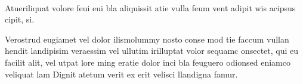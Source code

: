 \documentclass[a4paper,bcor=0mm,9pt,parskip=full,twoside]{tubsartcl}
\begin{document}

\begin{gaussbox}[logosep]{1}{1}{2}{8}
\large
\lipsum[4]
\end{gaussbox}
\begin{gaussbox}[c]{3}{1}{2}{8}
\large
\lipsum[2]
\end{gaussbox}
\begin{gaussbox}[b]{5}{1}{2}{8}
\large
\lipsum[2]
\end{gaussbox}
~\clearpage

\begin{gaussbox}{1}{1}{5}{1}
{\LARGE\sffamily\bfseries\raggedright Atueriliquat volore feui eui bla
aliquissit atie vulla feum vent
adipit wis acipsus cipit, si.\par}
\end{gaussbox}
\begin{gaussbox}[frame=fbox]{2}{2}{5}{1}
\mdseries
Verostrud eugiamet vel dolor ilismolummy nosto conse mod tie
faccum vullan hendit landipisim veraessim vel ullutim irilluptat volor
sequamc onsectet, qui eu facilit alit, vel utpat lore ming eratie dolor
inci bla feuguero odionsed eniamco veliquat lam Dignit atetum verit
ex erit velisci llandigna famur.
\end{gaussbox}
\begin{gaussbox}[c,bgcolor=tuGray20]{1}{3}{5}{6}
\lipsum[2]\par
\lipsum[2]\par
\end{gaussbox}
\clearpage~\clearpage
\end{document}
